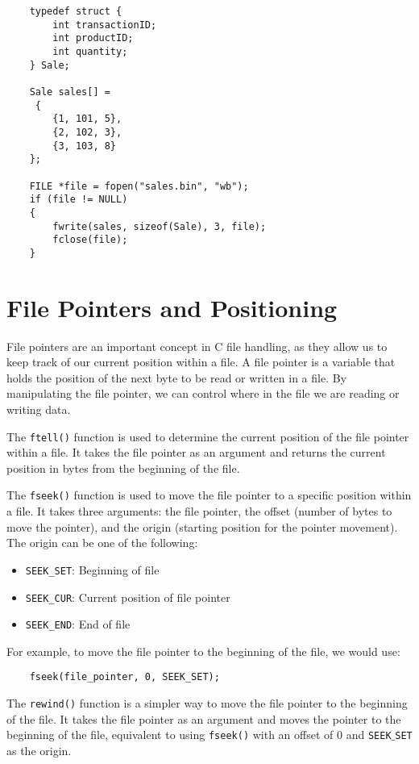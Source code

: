\begin{verbatim}
	typedef struct {
		int transactionID;
		int productID;
		int quantity;
	} Sale;
	
	Sale sales[] =
	 {
		{1, 101, 5},
		{2, 102, 3},
		{3, 103, 8}
	};
	
	FILE *file = fopen("sales.bin", "wb");
	if (file != NULL) 
	{
		fwrite(sales, sizeof(Sale), 3, file);
		fclose(file);
	}
\end{verbatim}


\section{File Pointers and Positioning}
File pointers are an important concept in C file handling, as they allow us to
keep track of our current position within a file. A file pointer is a variable
that holds the position of the next byte to be read or written in a file. By
manipulating the file pointer, we can control where in the file we are reading
or writing data.

The {\tt ftell()} function is used to determine the current position of the file
pointer within a file. It takes the file pointer as an argument and returns the
current position in bytes from the beginning of the file.

The {\tt fseek()} function is used to move the file pointer to a specific
position within a file. It takes three arguments: the file pointer, the offset
(number of bytes to move the pointer), and the origin (starting position for
the pointer movement). The origin can be one of the following:

\begin{itemize}
	\item {\tt SEEK_SET}: Beginning of file
	\item {\tt SEEK_CUR}: Current position of file pointer
	\item {\tt SEEK_END}: End of file
\end{itemize}

For example, to move the file pointer to the beginning of the file, we would use:

\begin{verbatim}
	fseek(file_pointer, 0, SEEK_SET);
\end{verbatim}

The {\tt rewind()} function is a simpler way to move the file pointer to the
beginning of the file. It takes the file pointer as an argument and moves the
pointer to the beginning of the file, equivalent to using {\tt fseek()} with
an offset of 0 and {\tt SEEK$\_$SET} as the origin.

